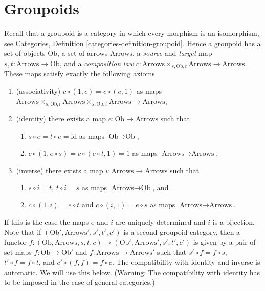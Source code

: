 \section{Groupoids}
\label{section-groupoids}

\noindent
Recall that a groupoid is a category in which every morphism
is an isomorphism, see
Categories, Definition \ref{categories-definition-groupoid}.
Hence a groupoid has a set of objects $\text{Ob}$,
a set of arrows $\text{Arrows}$, a {\it source} and {\it target}
map $s, t : \text{Arrows} \to \text{Ob}$, and a {\it composition law}
$c : \text{Arrows} \times_{s, \text{Ob}, t} \text{Arrows}
\to \text{Arrows}$.
These maps satisfy exactly the following axioms
\begin{enumerate}
\item (associativity) $c \circ (1, c) = c \circ (c, 1)$ as maps
$\text{Arrows} \times_{s, \text{Ob}, t}
\text{Arrows} \times_{s, \text{Ob}, t}
\text{Arrows} \to \text{Arrows}$,
\item (identity) there exists a map $e : \text{Ob} \to \text{Arrows}$
such that
\begin{enumerate}
\item $s \circ e = t \circ e = \text{id}$ as maps $\text{Ob} \to \text{Ob}$,
\item $c \circ (1, e \circ s) = c \circ (e \circ t, 1) = 1$
as maps $\text{Arrows} \to \text{Arrows}$,
\end{enumerate}
\item (inverse) there exists a map $i : \text{Arrows} \to \text{Arrows}$
such that
\begin{enumerate}
\item $s \circ i = t$, $t \circ i = s$ as maps $\text{Arrows} \to \text{Ob}$,
and
\item $c \circ (1, i) = e \circ t$ and $c \circ (i, 1) = e \circ s$
as maps $\text{Arrows} \to \text{Arrows}$.
\end{enumerate}
\end{enumerate}
If this is the case the maps $e$ and $i$ are uniquely determined and
$i$ is a bijection. Note that if $(\text{Ob}', \text{Arrows}', s', t', c')$
is a second groupoid category, then a functor
$f : (\text{Ob}, \text{Arrows}, s, t, c) \to
(\text{Ob}', \text{Arrows}', s', t', c')$
is given by a pair of set maps $f : \text{Ob} \to \text{Ob}'$ and
$f : \text{Arrows} \to \text{Arrows}'$ such that
$s' \circ f = f \circ s$, $t' \circ f = f \circ t$, and
$c' \circ (f, f) = f \circ c$. The compatibility with identity and
inverse is automatic. We will use this below.
(Warning: The compatibility with identity
has to be imposed in the case of general categories.)

